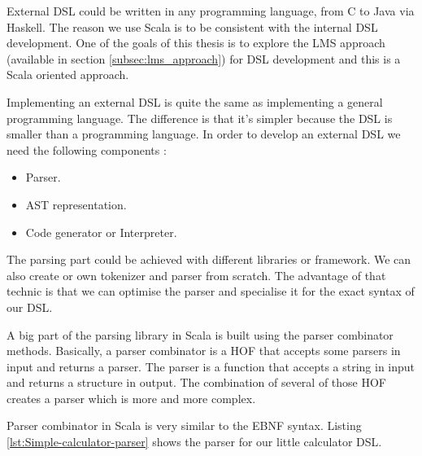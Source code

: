 External \gls{DSL} could be written in any programming language, from C to Java
via Haskell. The reason we use Scala is to be consistent with the internal
\gls{DSL} development. One of the goals of this thesis is to explore the
\gls{LMS} approach (available in section \ref{subsec:lms_approach}) for
\gls{DSL} development and this is a Scala oriented approach.

Implementing an external \gls{DSL} is quite the same as implementing a general
programming language. The difference is that it's simpler because the \gls{DSL}
is smaller than a programming language. In order to develop an external
\gls{DSL} we need the following components :

\begin{itemize}
\item Parser.
\item \gls{AST} representation.
\item Code generator or Interpreter.
\end{itemize}


The parsing part could be achieved with different libraries or framework. We can
also create or own tokenizer and parser from scratch. The advantage of that
technic is that we can optimise the parser and specialise it for the exact
syntax of our \gls{DSL}.

A big part of the parsing library in Scala is built using the parser combinator
method\cite{Odersky:2016:PSU:2988396}s. Basically, a parser combinator is a
\gls{HOF} that accepts some parsers in input and returns a parser. The parser is
a function that accepts a string in input and returns a structure in output. The
combination of several of those \gls{HOF} creates a parser which is more and more
complex.

Parser combinator in Scala is very similar to the \gls{EBNF} syntax. Listing
\ref{lst:Simple-calculator-parser} shows the parser for our little calculator \gls{DSL}.

